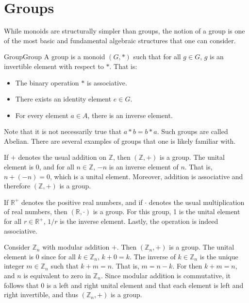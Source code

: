 \section{Groups}
    While monoids are structurally simpler than groups, the notion of a group is
    one of the most basic and fundamental algebraic structures that one can
    consider.
    \begin{fdefinition}{Group}{Group}
        A group is a \gls{monoid} $(G,*)$ such that for all $g\in{G}$, $g$ is an
        \gls{invertible element} with respect to $*$. That is:
        \begin{itemize}
            \item The binary operation $*$ is associative.
            \item There exists an identity element $e\in{G}$.
            \item For every element $a\in{A}$, there is an inverse element.
        \end{itemize}
    \end{fdefinition}
    Note that it is not necessarily true that $a*b=b*a$. Such groups are called
    Abelian. There are several examples of groups that one is likely familiar
    with.
    \begin{example}
        If $+$ denotes the usual addition on $\mathbb{Z}$, then
        $(\mathbb{Z},+)$ is a group. The unital element is 0, and for all
        $n\in\mathbb{Z}$, $\minus{n}$ is an inverse element of $n$. That is,
        $n+(\minus{n})=0$, which is a unital element. Moreover, addition is
        associative and therefore $(\mathbb{Z},+)$ is a group.
    \end{example}
    \begin{example}
        If $\mathbb{R}^{+}$ denotes the positive real numbers, and if $\cdot$
        denotes the usual multiplication of real numbers, then
        $(\mathbb{R},\cdot)$ is a group. For this group, 1 is the unital element
        for all $r\in\mathbb{R}^{+}$, $1/r$ is the inverse element. Lastly,
        the operation is indeed associative.
    \end{example}
    \begin{example}
        Consider $\mathbb{Z}_{n}$ with modular addition $+$. Then
        $(\mathbb{Z}_{n},+)$ is a group. The unital element is $0$ since for all
        $k\in\mathbb{Z}_{n}$, $k+0=k$. The inverse of $k\in\mathbb{Z}_{n}$ is
        the unique integer $m\in\mathbb{Z}_{n}$ such that $k+m=n$. That is,
        $m=n-k$. For then $k+m=n$, and $n$ is equivalent to zero in
        $\mathbb{Z}_{n}$. Since modular addition is commutative, it follows that
        $0$ is a left and right unital element and that each element is left and
        right invertible, and thus $(\mathbb{Z}_{n},+)$ is a group.
    \end{example}

